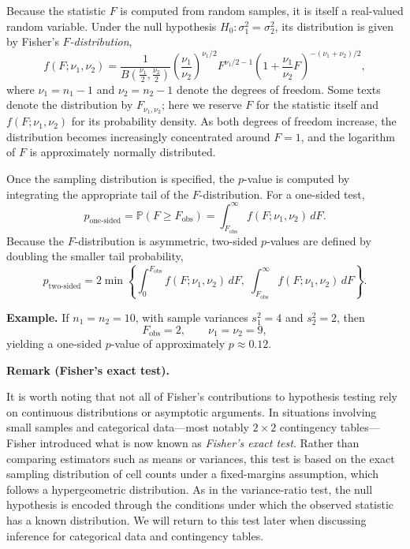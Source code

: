 \medskip

Because the statistic \(F\) is computed from random samples, it is itself a real-valued random variable. Under the null hypothesis \(H_0 : \sigma_1^2 = \sigma_2^2\), its distribution is given by Fisher’s \textit{\(F\)-distribution},
\begin{equation}
    f(F; \nu_1, \nu_2)
    =
    \frac{1}{B\!\left(\frac{\nu_1}{2},\frac{\nu_2}{2}\right)}
    \left(\frac{\nu_1}{\nu_2}\right)^{\nu_1/2}
    F^{\nu_1/2 - 1}
    \left(1 + \frac{\nu_1}{\nu_2}F\right)^{-(\nu_1+\nu_2)/2},
    \label{f_distribution}
\end{equation}
where \(\nu_1 = n_1 - 1\) and \(\nu_2 = n_2 - 1\) denote the degrees of freedom. Some texts denote the distribution by \(F_{\nu_1,\nu_2}\); here we reserve \(F\) for the statistic itself and \(f(F;\nu_1,\nu_2)\) for its probability density. As both degrees of freedom increase, the distribution becomes increasingly concentrated around \(F=1\), and the logarithm of \(F\) is approximately normally distributed.

\medskip

Once the sampling distribution is specified, the \(p\)-value is computed by integrating the appropriate tail of the \(F\)-distribution. For a one-sided test,
\[
    p_{\text{one-sided}}
    =
    \mathbb{P}(F \ge F_{\text{obs}})
    =
    \int_{F_{\text{obs}}}^{\infty} f(F;\nu_1,\nu_2)\,dF .
\]
Because the \(F\)-distribution is asymmetric, two-sided \(p\)-values are defined by doubling the smaller tail probability,
\[
    p_{\text{two-sided}}
    =
    2 \min \!\left\{
        \int_{0}^{F_{\text{obs}}} f(F;\nu_1,\nu_2)\,dF,\;
        \int_{F_{\text{obs}}}^{\infty} f(F;\nu_1,\nu_2)\,dF
    \right\}.
\]

\medskip

\textbf{Example.}
If \(n_1=n_2=10\), with sample variances \(s_1^2=4\) and \(s_2^2=2\), then
\[
    F_{\text{obs}} = 2,
    \qquad
    \nu_1=\nu_2=9,
\]
yielding a one-sided \(p\)-value of approximately \(p \approx 0.12\).

\medskip

\textbf{Remark (Fisher’s exact test).}

\medskip

It is worth noting that not all of Fisher’s contributions to hypothesis testing rely on continuous distributions or asymptotic arguments. In situations involving small samples and categorical data—most notably \(2\times2\) contingency tables—Fisher introduced what is now known as \textit{Fisher’s exact test}. Rather than comparing estimators such as means or variances, this test is based on the exact sampling distribution of cell counts under a fixed-margins assumption, which follows a hypergeometric distribution. As in the variance-ratio test, the null hypothesis is encoded through the conditions under which the observed statistic has a known distribution. We will return to this test later when discussing inference for categorical data and contingency tables.

